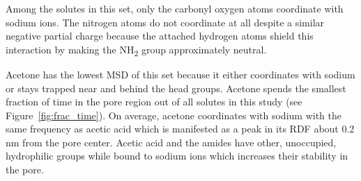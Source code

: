 \documentclass[journal=jpcbfk,manuscript=article]{achemso}
\begin{document}
  Among the solutes in this set, only the carbonyl oxygen atoms coordinate 
  with sodium ions. The nitrogen atoms do not coordinate at all despite a
  similar negative partial charge because the attached hydrogen atoms 
  shield this interaction by making the NH\textsubscript{2} group 
  approximately neutral.

  Acetone has the lowest MSD of this set because it either coordinates with
  sodium or stays trapped near and behind the head groups. Acetone spends the
  smallest fraction of time in the pore region out of all solutes in this study
  (see Figure~\ref{fig:frac_time}). On average, acetone coordinates with sodium
  with the same frequency as acetic acid which is manifested as a peak in its 
  RDF about 0.2 nm from the pore center. 
  Acetic acid and the amides have other, unoccupied, hydrophilic groups while
  bound to sodium ions which increases their stability in the pore.
  
\end{document}
